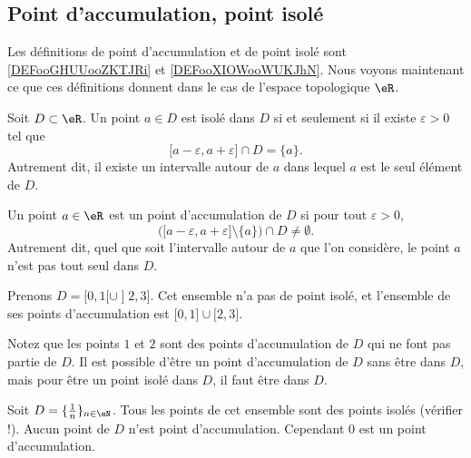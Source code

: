 \subsection{Point d'accumulation, point isolé}

Les définitions de point d'accumulation et de point isolé sont \ref{DEFooGHUUooZKTJRi} et \ref{DEFooXIOWooWUKJhN}. Nous voyons maintenant ce que ces définitions donnent dans le cas de l'espace topologique \( \eR\).

\begin{lemma}
	Soit \( D\subset\eR\). Un point \( a\in D\) est isolé dans \( D\) si et seulement si il existe \( \varepsilon>0\) tel que
	\begin{equation}
		\mathopen[ a-\varepsilon , a+\varepsilon \mathclose]\cap D=\{ a \}.
	\end{equation}
	Autrement dit, il existe un intervalle autour de \( a\) dans lequel \( a\) est le seul élément de \( D\).
\end{lemma}

\begin{lemma}
	Un point \( a\in \eR\) est un point d'accumulation de \( D\) si pour tout \( \varepsilon>0\),
	\begin{equation}
		\Big( \mathopen[ a-\varepsilon , a+\varepsilon \mathclose]\setminus\{ a \} \Big)\cap D\neq\emptyset.
	\end{equation}
	Autrement dit, quel que soit l'intervalle autour de  \( a\) que l'on considère, le point \( a\) n'est pas tout seul dans \( D\).
\end{lemma}

\begin{example}
	Prenons \( D=\mathopen[ 0 , 1 [\cup\mathopen] 2 , 3 \mathclose]\). Cet ensemble n'a pas de point isolé, et l'ensemble de ses points d'accumulation est \( \mathopen[ 0 , 1 \mathclose]\cup\mathopen[ 2,3  \mathclose]\).

	Notez que les points \( 1\) et \( 2\) sont des points d'accumulation de \( D\) qui ne font pas partie de \( D\). Il est possible d'être un point d'accumulation de \( D\) sans être dans \( D\), mais pour être un point isolé dans \( D\), il faut être dans \( D\).
\end{example}

\begin{example}
	Soit \( D=\{ \frac{1}{ n }\}_{n\in\eN}\). Tous les points de cet ensemble sont des points isolés (vérifier !).  Aucun point de \( D\) n'est point d'accumulation. Cependant \( 0\) est un point d'accumulation.
\end{example}

